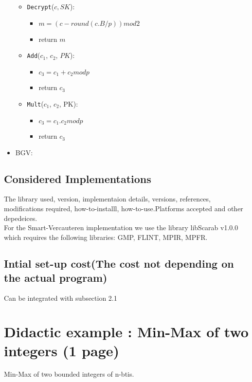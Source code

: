 \documentclass{acm_proc_article-sp}
\begin{document}
\begin{itemize}
\begin{itemize}
\begin{itemize}
\end{itemize}
\item \texttt{Decrypt}($c, SK$):
\begin{itemize}
\item $m= (c - round(c.B/p)) mod 2$
\item return $m$
\end{itemize}
\item \texttt{Add}($c_1$, $c_2$, $PK$):
\begin{itemize}
\item $c_3=c_1+c_2 mod p$
\item return $c_3$
\end{itemize}
\item \texttt{Mult}($c_1$, $c_2$, PK):
\begin{itemize}
\item $c_3=c_1.c_2 mod p$
\item return $c_3$
\end{itemize}
\end{itemize}
\item BGV:
\end{itemize}
\subsection{Considered Implementations}

The library used, version, implementaion details, versions, references, modifications required, how-to-installl, how-to-use.Platforms accepted and other depedeices.\\
For the Smart-Vercauteren implementation we use the library libScarab v1.0.0 which requires the following libraries: GMP, FLINT, MPIR, MPFR.
\subsection{Intial set-up cost(The cost not depending on the actual program)}

Can be integrated with subsection 2.1 

\section{ Didactic example :  Min-Max of two integers (1 page)}
Min-Max of two bounded integers of n-btis.
\end{document}

